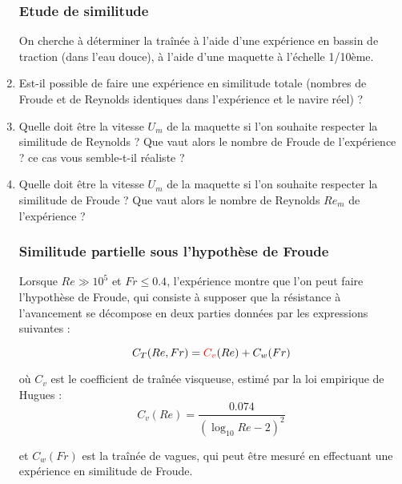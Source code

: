 \begin{enumerate}


\subsubsection{Etude de similitude}

On cherche à déterminer la traînée à l'aide d'une expérience en bassin de traction (dans l'eau douce), à l'aide d'une maquette à l'échelle 1/10ème.

\item Est-il possible de faire une expérience en similitude totale (nombres de Froude et de Reynolds identiques dans l'expérience et le navire réel) ? 


\item Quelle doit être la vitesse $U_m$ de la maquette si l'on souhaite respecter la similitude de Reynolds ? Que vaut alors le nombre de Froude de l'expérience ? ce cas vous semble-t-il réaliste ?



\item Quelle doit être la vitesse $U_m$ de la maquette si l'on souhaite respecter la similitude de Froude ? Que vaut alors le nombre de Reynolds $Re_m$ de l'expérience ?


\subsubsection{Similitude partielle sous l'hypothèse de Froude} 

 Lorsque $Re \gg 10^{5}$ et $Fr \le 0.4$, l'expérience montre que l'on peut faire l'hypothèse de Froude, qui consiste à supposer que la  résistance à l'avancement se décompose en deux parties données par les expressions suivantes :

$$
C_T(Re, Fr) = {\color{red} C_v} (Re) + C_{w}(Fr) 
$$ 

où $C_v$ est le coefficient de traînée visqueuse, estimé par la loi empirique de Hugues :
$$
C_v(Re) = \frac{0.074}{\left( \log_{10} Re - 2 \right)^2}
$$

et $C_{w}(Fr)$ est la traînée de vagues, qui peut être mesuré en effectuant une expérience en similitude de Froude.


\end{enumerate}
